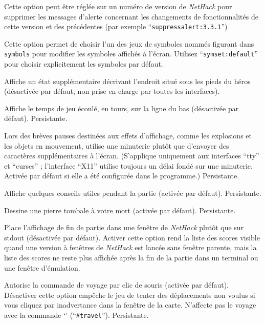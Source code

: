 \documentclass[titlepage]{article}
\begin{document}
\begin{description}[font=\mdseries\itshape]
\item[suppress\textunderscore alert]
Cette option peut être réglée sur un numéro de version de \textit{NetHack} pour supprimer
les messages d'alerte concernant les changements de fonctionnalités de cette version
et des précédentes (par exemple ``\texttt{suppress\textunderscore alert:3.3.1}'')
\item[symset]
Cette option permet de choisir l'un des jeux de symboles nommés figurant dans
\texttt{symbols} pour modifier les symboles affichés à l'écran.
Utilisez ``\texttt{symset:default}'' pour choisir explicitement les symboles par défaut.
\item[terrainstatus]
Affiche un état supplémentaire décrivant l'endroit situé sous les pieds du
héros (désactivée par défaut, non prise en charge par toutes les interfaces).
\item[time]
Affiche le temps de jeu écoulé, en tours, sur la ligne du bas (désactivée par défaut). Persistante.
\item[timed\textunderscore delay]
Lors des brèves pauses destinées aux effets d'affichage, comme les explosions et
les objets en mouvement, utilise une minuterie plutôt que d'envoyer des caractères
supplémentaires à l'écran. (S'applique uniquement aux interfaces ``tty'' et ``curses'' ; l'interface ``X11''
utilise toujours un délai fondé sur une minuterie. Activée par défaut si elle a été configurée
dans le programme.) Persistante.
\item[tips]
Affiche quelques conseils utiles pendant la partie (activée par défaut). Persistante.
\item[tombstone]
Dessine une pierre tombale à votre mort (activée par défaut). Persistante.
\item[toptenwin]
Place l'affichage de fin de partie dans une fenêtre de \textit{NetHack} plutôt que sur stdout (désactivée par défaut).
Activer cette option rend la liste des scores visible quand une version à fenêtres
de \textit{NetHack} est lancée sans fenêtre parente, mais la liste des scores ne reste
plus affichée après la fin de la partie dans un terminal ou une fenêtre d'émulation.
\item[travel]
Autorise la commande de voyage par clic de souris (activée par défaut).
Désactiver cette option empêche le jeu de tenter des déplacements non voulus
si vous cliquez par inadvertance dans la fenêtre de la carte.
N'affecte pas le voyage avec la commande `\texttt{\textunderscore}' (``\texttt{\#travel}'').
Persistante.

\end{description}
\end{document}

